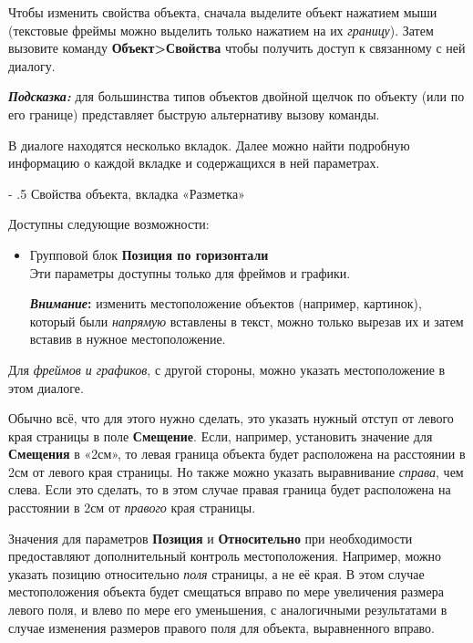 ﻿\documentclass[a4paper,10pt]{article}
\makeatletter
\renewcommand\paragraph{%
   \@startsection{paragraph}{4}{0mm}%
      {-\baselineskip}%
      {.5\baselineskip}%
      {\normalfont\normalsize\bfseries}}
\makeatother
\begin{document}
Чтобы изменить свойства объекта, сначала выделите объект нажатием мыши (текстовые фреймы можно выделить только нажатием на их \textit{границу}). Затем вызовите команду \textbf{Объект>Свойства} чтобы получить доступ к связанному с ней диалогу.

\begin{mdframed}[backgroundcolor=blue!10]
\textbf{\textit{Подсказка:}} для большинства типов объектов двойной щелчок по объекту (или по его границе) представляет быструю альтернативу вызову команды.
\end{mdframed}

В диалоге находятся несколько вкладок. Далее можно найти подробную информацию о каждой вкладке и содержащихся в ней параметрах.

\paragraph{Свойства объекта, вкладка «Разметка»} \label{sec:свойстваобъектавклразметка}

Доступны следующие возможности:

\begin{itemize}
 \item Групповой блок \textbf{Позиция по горизонтали}\\
 Эти параметры доступны только для фреймов и графики.
 
 \begin{mdframed}[backgroundcolor=blue!10]
\textbf{\textit{Внимание}:} изменить местоположение объектов (например, картинок), который были \textit{напрямую} вставлены в текст, можно только вырезав их и затем вставив в нужное местоположение.
\end{mdframed}
\end{itemize}

Для \textit{фреймов и графиков}, с другой стороны, можно указать местоположение в этом диалоге.

Обычно всё, что для этого нужно сделать, это указать нужный отступ от левого края страницы в поле \textbf{Смещение}. Если, например, установить значение для \textbf{Смещения} в «2см», то левая граница объекта будет расположена на расстоянии в 2см от левого края страницы. Но также можно указать выравнивание \textit{справа}, чем слева. Если это сделать, то в этом случае правая граница будет расположена на расстоянии в 2см от \textit{правого} края страницы.

Значения для параметров \textbf{Позиция} и \textbf{Относительно} при необходимости предоставляют дополнительный контроль местоположения. Например, можно указать позицию относительно \textit{поля} страницы, а не её края. В этом случае местоположения объекта будет смещаться вправо по мере увеличения размера левого поля, и влево по мере его уменьшения, с аналогичными результатами в случае изменения размеров правого поля для объекта, выравненного вправо.
\end{document}
